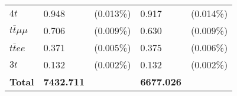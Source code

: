 \begin{tabular}{L{35mm} R{15mm}R{15mm} R{15mm}R{15mm}}
$4t$                        & 0.948                             & (0.013\%)                     & 0.917                             & (0.014\%)                  \\
$t\bar{t}\mu\mu$            & 0.706                             & (0.009\%)                     & 0.630                             & (0.009\%)                  \\
$t\bar{t}ee$                & 0.371                             & (0.005\%)                     & 0.375                             & (0.006\%)                  \\
$3t$                        & 0.132                             & (0.002\%)                     & 0.132                             & (0.002\%)                  \\
\textbf{Total}              & \textbf{7432.711}                 &                               & \textbf{6677.026}                 &                            \\
\bottomrule
\end{tabular}